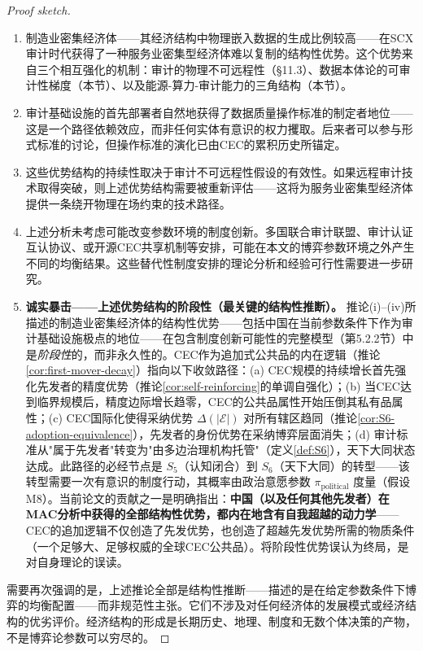 \documentclass[12pt,a4paper]{ctexart}
\theoremstyle{definition}
\theoremstyle{remark}
\begin{document}
\begin{proof}[Proof sketch]
\begin{enumerate}[label=(\roman*)]
    \item 制造业密集经济体——其经济结构中物理嵌入数据的生成比例较高——在SCX审计时代获得了一种服务业密集型经济体难以复制的结构性优势。这个优势来自三个相互强化的机制：审计的物理不可远程性（§11.3）、数据本体论的可审计性梯度（本节）、以及能源-算力-审计能力的三角结构（本节）。
    \item 审计基础设施的首先部署者自然地获得了数据质量操作标准的制定者地位——这是一个路径依赖效应，而非任何实体有意识的权力攫取。后来者可以参与形式标准的讨论，但操作标准的演化已由CEC的累积历史所锚定。
    \item 这些优势结构的持续性取决于审计不可远程性假设的有效性。如果远程审计技术取得突破，则上述优势结构需要被重新评估——这将为服务业密集型经济体提供一条绕开物理在场约束的技术路径。
    \item 上述分析未考虑可能改变参数环境的制度创新。多国联合审计联盟、审计认证互认协议、或开源CEC共享机制等安排，可能在本文的博弈参数环境之外产生不同的均衡结果。这些替代性制度安排的理论分析和经验可行性需要进一步研究。
    \item \textbf{诚实暴击——上述优势结构的阶段性（最关键的结构性推断）。} 推论(i)--(iv)所描述的制造业密集经济体的结构性优势——包括中国在当前参数条件下作为审计基础设施极点的地位——在包含制度创新可能性的完整模型（第5.2.2节）中是\textit{阶段性}的，而非永久性的。CEC作为追加式公共品的内在逻辑（推论\ref{cor:first-mover-decay}）指向以下收敛路径：(a) CEC规模的持续增长首先强化先发者的精度优势（推论\ref{cor:self-reinforcing}的单调自强化）；(b) 当CEC达到临界规模后，精度边际增长趋零，CEC的公共品属性开始压倒其私有品属性；(c) CEC国际化使得采纳优势 $\Delta(|\mathcal{E}|)$ 对所有辖区趋同（推论\ref{cor:S6-adoption-equivalence}），先发者的身份优势在采纳博弈层面消失；(d) 审计标准从"属于先发者"转变为"由多边治理机构托管"（定义\ref{def:S6}），天下大同状态达成。此路径的必经节点是 $S_5$（认知闭合）到 $S_6$（天下大同）的转型——该转型需要一次有意识的制度行动，其概率由政治意愿参数 $\pi_{\text{political}}$ 度量（假设M8）。当前论文的贡献之一是明确指出：\textbf{中国（以及任何其他先发者）在MAC分析中获得的全部结构性优势，都内在地含有自我超越的动力学}——CEC的追加逻辑不仅创造了先发优势，也创造了超越先发优势所需的物质条件（一个足够大、足够权威的全球CEC公共品）。将阶段性优势误认为终局，是对自身理论的误读。
\end{enumerate}

需要再次强调的是，上述推论全部是结构性推断——描述的是在给定参数条件下博弈的均衡配置——而非规范性主张。它们不涉及对任何经济体的发展模式或经济结构的优劣评价。经济结构的形成是长期历史、地理、制度和无数个体决策的产物，不是博弈论参数可以穷尽的。


\end{proof}
\end{document}
